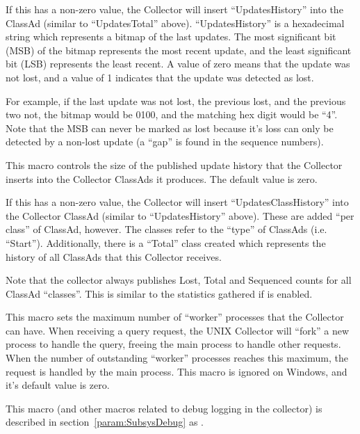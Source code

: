 \begin{description}
  If this has a non-zero value, the Collector will insert
  ``UpdatesHistory'' into the ClassAd (similar to ``UpdatesTotal''
  above).  ``UpdatesHistory'' is a hexadecimal string which represents
  a bitmap of the last 
  updates.  The most significant bit (MSB) of the bitmap represents the
  most recent update, and the least significant bit (LSB) represents
  the least recent.  A value of zero means that the update was not
  lost, and a value of 1 indicates that the update was detected as
  lost.

  For example, if the last update was not lost, the previous lost, and
  the previous two not, the bitmap would be 0100, and the matching hex
  digit would be ``4''.  Note that the MSB can never be marked as lost
  because it's loss can only be detected by a non-lost update (a
  ``gap'' is found in the sequence numbers).

\item[\Macro{COLLECTOR\_CLASS\_HISTORY\_SIZE}]
  \label{param:CollectorClassHistorySize} This macro controls the
  size of the published update history that the Collector inserts into
  the Collector ClassAds it produces.  The default value is zero.

  If this has a non-zero value, the Collector will insert
  ``UpdatesClassHistory'' into the Collector ClassAd (similar to
  ``UpdatesHistory'' above).  These are added ``per class'' of
  ClassAd, however.  The classes refer to the ``type'' of ClassAds
  (i.e. ``Start'').  Additionally, there is a ``Total'' class created
  which represents the history of all ClassAds that this Collector
  receives.

  Note that the collector always publishes Lost, Total and Sequenced
  counts for all ClassAd ``classes''.  This is similar to the
  statistics gathered if  is enabled.

 \item[\Macro{COLLECTOR\_QUERY\_WORKERS}]
  \label{param:CollectorQueryWorkers} This macro sets the maximum
  number of ``worker'' processes that the Collector can have.  When
  receiving a query request, the UNIX Collector will ``fork'' a new
  process to handle the query, freeing the main process to handle
  other requests.  When the number of outstanding ``worker'' processes
  reaches this maximum, the request is handled by the main process.
  This macro is ignored on Windows, and it's default value is zero.

\item[\Macro{COLLECTOR\_DEBUG}] \label{param:CollectorDebug} This
  macro (and other macros related to debug logging in the collector)
  is described in section~\ref{param:SubsysDebug} as
  .

\end{description}

